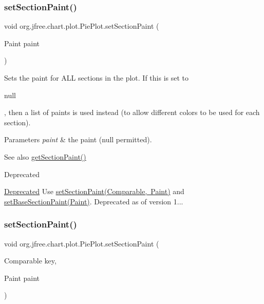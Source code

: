 \subsubsection{\texorpdfstring{set\+Section\+Paint()}{setSectionPaint()}\hspace{0.1cm}{\footnotesize\ttfamily [1/3]}}
{\footnotesize\ttfamily void org.\+jfree.\+chart.\+plot.\+Pie\+Plot.\+set\+Section\+Paint (\begin{DoxyParamCaption}\item[{Paint}]{paint }\end{DoxyParamCaption})}

Sets the paint for A\+LL sections in the plot. If this is set to 
\begin{DoxyCode}
null 
\end{DoxyCode}
 , then a list of paints is used instead (to allow different colors to be used for each section).


\begin{DoxyParams}{Parameters}
{\em paint} & the paint ({\ttfamily null} permitted).\\
\hline
\end{DoxyParams}
\begin{DoxySeeAlso}{See also}
\mbox{\hyperlink{classorg_1_1jfree_1_1chart_1_1plot_1_1_pie_plot_ad50a2ec9a9fb6fdf8992e8f64f57bd1d}{get\+Section\+Paint()}}
\end{DoxySeeAlso}
\begin{DoxyRefDesc}{Deprecated}
\item[\mbox{\hyperlink{deprecated__deprecated000064}{Deprecated}}]Use \mbox{\hyperlink{classorg_1_1jfree_1_1chart_1_1plot_1_1_pie_plot_adee3362fbb406b556846f698e0ce628f}{set\+Section\+Paint(\+Comparable, Paint)}} and \mbox{\hyperlink{classorg_1_1jfree_1_1chart_1_1plot_1_1_pie_plot_a582a3691ba857599da8b77596e812a04}{set\+Base\+Section\+Paint(\+Paint)}}. Deprecated as of version 1... \end{DoxyRefDesc}
\mbox{\label{classorg_1_1jfree_1_1chart_1_1plot_1_1_pie_plot_adee3362fbb406b556846f698e0ce628f}} 
\subsubsection{\texorpdfstring{set\+Section\+Paint()}{setSectionPaint()}\hspace{0.1cm}{\footnotesize\ttfamily [2/3]}}
{\footnotesize\ttfamily void org.\+jfree.\+chart.\+plot.\+Pie\+Plot.\+set\+Section\+Paint (\begin{DoxyParamCaption}\item[{Comparable}]{key,  }\item[{Paint}]{paint }\end{DoxyParamCaption})}

